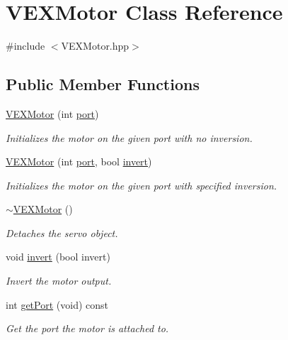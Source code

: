 \hypertarget{class_v_e_x_motor}{}\section{V\+E\+X\+Motor Class Reference}
\label{class_v_e_x_motor}


{\ttfamily \#include $<$V\+E\+X\+Motor.\+hpp$>$}

\subsection*{Public Member Functions}
\begin{DoxyCompactItemize}
\item 
\hyperlink{class_v_e_x_motor_a580907c6cae0d4f8c525c5ce5916c9f8}{V\+E\+X\+Motor} (int \hyperlink{class_v_e_x_motor_a4d116557bd4fd7149a498980369bace5}{port})
\begin{DoxyCompactList}\small\item\em Initializes the motor on the given port with no inversion. \end{DoxyCompactList}\item 
\hyperlink{class_v_e_x_motor_a7de15da93ffb3034b3dc34d106b68ac6}{V\+E\+X\+Motor} (int \hyperlink{class_v_e_x_motor_a4d116557bd4fd7149a498980369bace5}{port}, bool \hyperlink{class_v_e_x_motor_a2c4c51b0b9c1c6747e0a8f1cee9f39e3}{invert})
\begin{DoxyCompactList}\small\item\em Initializes the motor on the given port with specified inversion. \end{DoxyCompactList}\item 
\hyperlink{class_v_e_x_motor_a1f0c73e1feb9f1bbe6bcc1216e8de430}{$\sim$\+V\+E\+X\+Motor} ()
\begin{DoxyCompactList}\small\item\em Detaches the servo object. \end{DoxyCompactList}\item 
void \hyperlink{class_v_e_x_motor_a2c4c51b0b9c1c6747e0a8f1cee9f39e3}{invert} (bool invert)
\begin{DoxyCompactList}\small\item\em Invert the motor output. \end{DoxyCompactList}\item 
int \hyperlink{class_v_e_x_motor_a8e1dd31396f89ade88141685243cf8e7}{get\+Port} (void) const
\begin{DoxyCompactList}\small\item\em Get the port the motor is attached to. \end{DoxyCompactList}\item 

\end{DoxyCompactItemize}
